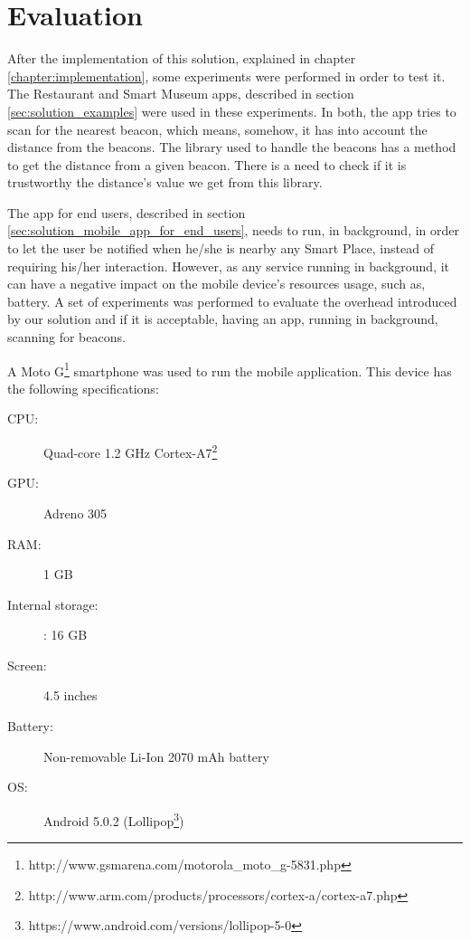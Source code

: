 
\chapter{Evaluation}
\label{chapter:evaluation}

After the implementation of this solution, explained in chapter \ref{chapter:implementation}, some experiments were performed in order to test it.
The Restaurant and Smart Museum apps, described in section \ref{sec:solution_examples} were used in these experiments. In both, the app tries to scan for the nearest beacon, which means, somehow, it has into account the distance from the beacons.
The library used to handle the beacons has a method to get the distance from a given beacon.
There is a need to check if it is trustworthy the distance's value we get from this library.

The app for end users, described in section \ref{sec:solution_mobile_app_for_end_users}, needs to run, in background, in order to let the user be notified when he/she is nearby any Smart Place, instead of requiring his/her interaction.
However, as any service running in background, it can have a negative impact on the mobile device's resources usage, such as, battery.
A set of experiments was performed to evaluate the overhead introduced by our solution and if it is acceptable, having an app, running in background, scanning for beacons.

A 
Moto G\footnote{http://www.gsmarena.com/motorola\_moto\_g-5831.php} smartphone was used to run the mobile application. This device has the following specifications:
\begin{description}
  \item[\gls{CPU}:] Quad-core 1.2 GHz Cortex-A7\footnote{http://www.arm.com/products/processors/cortex-a/cortex-a7.php}
  \item[\gls{GPU}:] Adreno 305
  \item[\gls{RAM}:] 1 \gls{GB}
  \item[Internal storage:]: 16 \gls{GB}
  \item[Screen:] 4.5 inches
  \item[Battery:] Non-removable Li-Ion 2070 \gls{mAh} battery
  \item[\gls{OS}:] Android 5.0.2 (Lollipop\footnote{https://www.android.com/versions/lollipop-5-0})
\end{description}

